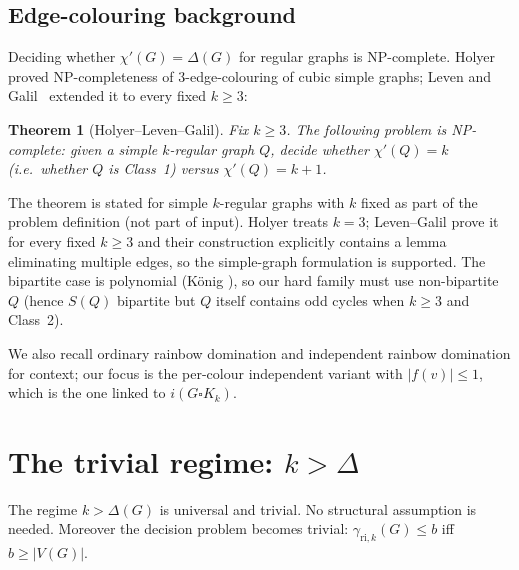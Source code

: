\documentclass[11pt,a4paper]{article}
\theoremstyle{plain}
\newtheorem{theorem}{Theorem}[section]
\theoremstyle{definition}
\newcommand{\gri}{\gamma_{\mathrm{ri},k}}
\newcommand{\cardK}{\square K_k}
\begin{document}
\subsection{Edge-colouring background}

Deciding whether $\chi'(G)=\Delta(G)$ for regular graphs is NP-complete.
Holyer~\cite{Holyer1981} proved NP-completeness of $3$-edge-colouring of cubic simple graphs; Leven and Galil~\cite{LevenGalil1983} extended it to every fixed $k\ge 3$:

\begin{theorem}[Holyer--Leven--Galil]\label{thm:edge-colour}
Fix $k\ge 3$. The following problem is NP-complete: given a simple $k$-regular graph $Q$, decide whether $\chi'(Q)=k$ (i.e.\ whether $Q$ is Class~1) versus $\chi'(Q)=k+1$.
\end{theorem}

The theorem is stated for simple $k$-regular graphs with $k$ fixed as part of the problem definition (not part of input). Holyer treats $k=3$; Leven--Galil prove it for every fixed $k\ge3$ and their construction explicitly contains a lemma eliminating multiple edges, so the simple-graph formulation is supported. The bipartite case is polynomial (K\"onig \cite{Konig1916}), so our hard family must use non-bipartite $Q$ (hence $S(Q)$ bipartite but $Q$ itself contains odd cycles when $k\ge3$ and Class~2).

We also recall ordinary rainbow domination \cite{BresarSum2007,HartnellRall2013} and independent rainbow domination \cite{KST2018,BK2019} for context; our focus is the per-colour independent variant with $|f(v)|\le1$, which is the one linked to $i(G\cardK)$.

\section{The trivial regime: \texorpdfstring{$k>\Delta$}{k > Delta}}\label{sec:trivial}

The regime $k>\Delta(G)$ is universal and trivial. No structural assumption is needed. Moreover the decision problem becomes trivial: $\gri(G)\le b$ iff $b\ge|V(G)|$.
\end{document}
